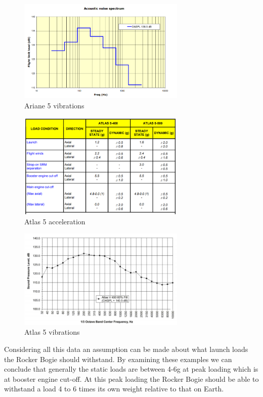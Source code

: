 \begin{figure}[h!]
\centering
\includegraphics[width=8cm]{figures/Ariane5_Vibr.png}
\caption{Ariane 5 vibrations}
\label{Ariane 5 virbrations}
\end{figure}

\begin{figure}[h!]
\centering
\includegraphics[width=8cm]{figures/Atlas5_acc.PNG}
\caption{Atlas 5 acceleration}
\label{Atlas 5 acceleration}
\end{figure}

\begin{figure}[h!]
\centering
\includegraphics[width=8cm]{figures/Atlas5_vibr.PNG}
\caption{Atlas 5 vibrations}
\label{Atlas 5 virbrations}
\end{figure}

Considering all this data an assumption can be made about what launch loads the Rocker Bogie should withstand. By examining these examples we can conclude that generally the static loads are between 4-6g at peak loading which is at booster engine cut-off. At this peak loading the Rocker Bogie should be able to withstand a load 4 to 6 times its own weight relative to that on Earth.
\\

